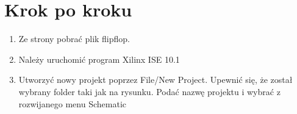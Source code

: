 \documentclass{article}
\begin{document}
\section{Krok po kroku}
\begin{enumerate}
\item Ze strony pobrać plik flipflop.
\item Należy uruchomić program Xilinx ISE 10.1
\item Utworzyć nowy projekt poprzez File/New Project. Upewnić się, że został wybrany folder taki jak na rysunku. Podać nazwę projektu i wybrać z rozwijanego menu Schematic\\ \begin{minipage}[t]{\linewidth}
          \raggedright


\end{minipage}
\end{enumerate}
\end{document}
